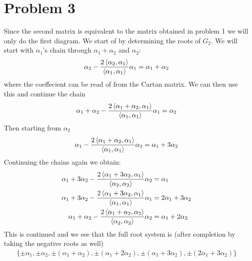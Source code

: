 \documentclass[a4paper,12pt]{article}
\begin{document}
\section*{Problem 3}
Since the second matrix is equivalent to the matrix obtained in problem 1 we will only do the first diagram. We start of by determining the roots of $G_2$. We will start with $\alpha_1$'s chain through $\alpha_1+\alpha_2$ and $\alpha_2$:
\begin{equation}
	\begin{aligned}
		\alpha_2-\frac{2\expval{\alpha_2,\alpha_1}}{\expval{\alpha_1,\alpha_1}}\alpha_1=\alpha_1+\alpha_2
	\end{aligned}
\end{equation}
where the coeffecient can be read of from the Cartan matrix. We can then use this and continue the chain
\begin{equation}
	\begin{aligned}
		\alpha_1+\alpha_2-\frac{2\expval{\alpha_1+\alpha_2,\alpha_1}}{\expval{\alpha_1,\alpha_1}}\alpha_1=\alpha_2
	\end{aligned}
\end{equation}
Then starting from $\alpha_2$ 
\begin{equation}
	\begin{aligned}
		\alpha_1-\frac{2\expval{\alpha_1+\alpha_2,\alpha_1}}{\expval{\alpha_1,\alpha_1}}\alpha_2=\alpha_1+3\alpha_2
	\end{aligned}
\end{equation}
Continuing the chains again we obtain:
\begin{equation}
	\begin{aligned}
		\alpha_1+3\alpha_2-\frac{2\expval{\alpha_1+3\alpha_2,\alpha_1}}{\expval{\alpha_2,\alpha_2}}\alpha_2&=\alpha_1\\
			\alpha_1+3\alpha_2-\frac{2\expval{\alpha_1+3\alpha_2,\alpha_1}}{\expval{\alpha_1,\alpha_1}}\alpha_1&=2\alpha_1+3\alpha_2\\
		\alpha_1+\alpha_2-\frac{2\expval{\alpha_1+\alpha_2,\alpha_2}}{\expval{\alpha_2,\alpha_2}}\alpha_2&=\alpha_1+2\alpha_2\\
	\end{aligned}
\end{equation}
This is continued and we see that the full root system is (after completion by taking the negative roots as well)
\begin{equation}
	\begin{aligned}
		\{\pm \alpha_1,\pm \alpha_2,\pm(\alpha_1+\alpha_2),\pm(\alpha_1+2\alpha_2),\pm(\alpha_1+3\alpha_2),\pm(2\alpha_1+3\alpha_2)\}
	\end{aligned}
\end{equation}
\end{document}
